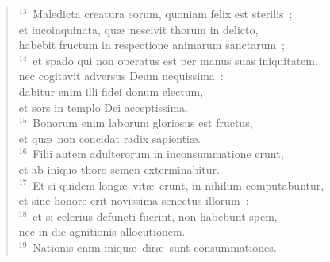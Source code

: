 \begin{verse}
${}^{13}$~Maledicta creatura eorum, quoniam felix est sterilis~;\\ et incoinquinata, qu\ae\ nescivit thorum in delicto,\\ habebit fructum in respectione animarum sanctarum~;\\
${}^{14}$~et spado qui non operatus est per manus suas iniquitatem,\\ nec cogitavit adversus Deum nequissima~:\\ dabitur enim illi fidei donum electum,\\ et sors in templo Dei acceptissima.\\
${}^{15}$~Bonorum enim laborum gloriosus est fructus,\\ et qu\ae\ non concidat radix sapienti\ae .\\
${}^{16}$~Filii autem adulterorum in inconsummatione erunt,\\ et ab iniquo thoro semen exterminabitur.\\
${}^{17}$~Et si quidem long\ae\ vit\ae\ erunt, in nihilum computabuntur,\\ et sine honore erit novissima senectus illorum~:\\
${}^{18}$~et si celerius defuncti fuerint, non habebunt spem,\\ nec in die agnitionis allocutionem.\\
${}^{19}$~Nationis enim iniqu\ae\ dir\ae\ sunt consummationes.\end{verse}


